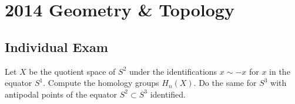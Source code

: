 \section{2014 Geometry \& Topology}

\subsection{Individual Exam}

\begin{exercise}
\label{geometry:2014:1}
Let $X$ be the quotient space of $S^{2}$ under the identifications $x \sim -x$ for $x$ in the equator $S^{1}$. Compute the homology groups $H_{n}(X)$. Do the same for $S^{3}$ with antipodal points of the equator $S^{2} \subset S^{3}$ identified.
\end{exercise}

